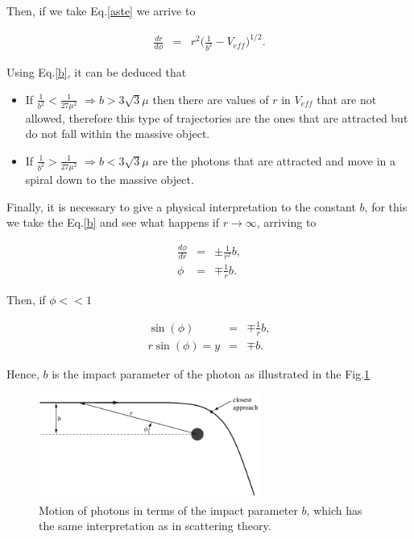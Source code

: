 \documentclass[letterpaper,11pt,onecolumn]{article}
\begin{document}
Then, if we take Eq.\ref{aste} we arrive to

\begin{eqnarray}
\frac{dr}{d\phi}&=&r^{2}\Big(\frac{1}{b^{2}}-V_{eff}\Big)^{1/2}\label{b}.
\end{eqnarray}

Using Eq.\ref{b}, it can be deduced that

\begin{itemize}
\item If $\frac{1}{b^{2}}<\frac{1}{27\mu^{2}}$ $\Rightarrow b>3\sqrt{3}\mu$  then there are values of $r$ in $V_{eff}$ that are not allowed, therefore this type of trajectories are the ones that are attracted but do not fall within the massive object.
\item If $\frac{1}{b^{2}}>\frac{1}{27\mu^{2}}$ $\Rightarrow b<3\sqrt{3}\mu$ are the photons that are attracted and move in a spiral down to the massive object.
\end{itemize}

Finally, it is necessary to give a physical interpretation to the constant $b$, for this we take the Eq.\ref{b} and see what happens if $r\rightarrow \infty$, arriving to

\begin{eqnarray*}
    \frac{d\phi}{dr}&=&\pm \frac{1}{r^{2}}b,\\
    \phi&=&\mp \frac{1}{r}b.
\end{eqnarray*}

Then, if $\phi << 1$ 

\begin{eqnarray*}
       \sin(\phi)&=&\mp \frac{1}{r}b, \\
       r \sin(\phi)=y&=&\mp b.
\end{eqnarray*}

Hence, $b$ is the impact parameter of the photon as illustrated in the Fig.\ref{bp}

 \begin{figure}[h!]
    \centering
    \includegraphics[width=0.65\textwidth]{Report/Images/3_foton_esc_b.png}
    \caption{Motion of photons in terms of the impact parameter $b$, which has the same interpretation as in scattering theory.}
\label{bp}
\end{figure}
\end{document}
